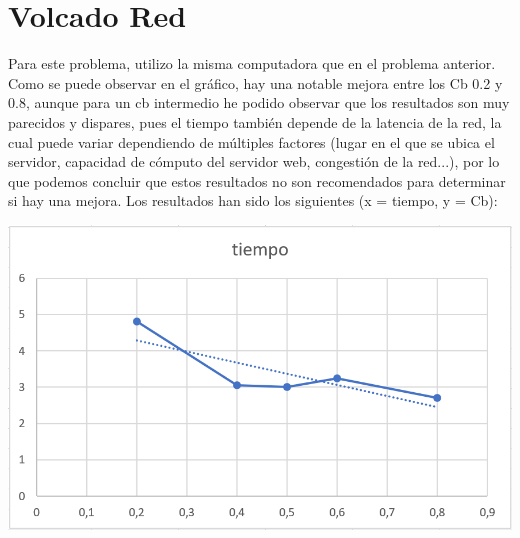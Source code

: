 \documentclass{article}
\begin{document}
\section{Volcado Red}
Para este problema, utilizo la misma computadora que en el problema anterior. Como se puede observar en el gráfico, hay una notable mejora entre los Cb 0.2 y 0.8, aunque para un cb intermedio he podido observar que los resultados son muy parecidos y dispares, pues el tiempo también depende de la latencia de la red, la cual puede variar dependiendo de múltiples factores (lugar en el que se ubica el servidor, capacidad de cómputo del servidor web, congestión de la red...), por lo que podemos concluir que estos resultados no son recomendados para determinar si hay una mejora. Los resultados han sido los siguientes (x = tiempo, y = Cb):
\hfill \break
\begin{center}
\includegraphics[scale=0.45]{grafico-ejercicio1-red-tiempo-cb.png}

\end{center}
\end{document}
